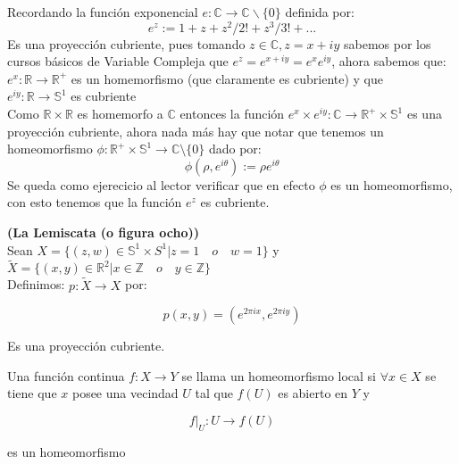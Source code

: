 \begin{example}
Recordando la funci\'on exponencial $e:\mathbb{C} \rightarrow \mathbb{C} \backslash \lbrace 0 \rbrace$ definida por:
$$ e^z:=1+z+z^2/2!+z^3/3!+...$$
Es una proyecci\'on cubriente, pues tomando $z \in \mathbb{C}, z=x+iy$ sabemos por los cursos b\'asicos de Variable Compleja que $e^z=e^{x+iy}=e^x e^{iy}$, ahora sabemos que:\\

$e^x: \mathbb R \rightarrow \mathbb{R^{+}} $ es un homemorfismo (que claramente es cubriente) y que\\

$e^{iy}: \mathbb R \rightarrow \mathbb S^1 $ es cubriente\\
Como $\mathbb R \times \mathbb R$ es homemorfo a $\mathbb{C}$ entonces la funci\'on $e^x \times e^{iy} :\mathbb{C} \rightarrow \mathbb{R^{+}} \times \mathbb S^{1}$ es una proyecci\'on cubriente, ahora nada m\'as hay que notar que tenemos un homeomorfismo $\phi :\mathbb{R^{+}} \times \mathbb S^1 \rightarrow \mathbb{C}\setminus \lbrace 0 \rbrace$ dado por: 
$$\phi(\rho,e^{i \theta}):= \rho e^{i \theta}$$
Se queda como ejerecicio al lector verificar que en efecto $\phi$ es un homeomorfismo, con esto tenemos que la funci\'on $e^z$ es cubriente.\\
\end{example}

\begin{example} \textbf{(La Lemiscata (o figura ocho))}\\
Sean $X=\lbrace (z,w) \in \mathbb S^1\times S^1 \vert z=1 \quad o \quad w=1 \rbrace$ y $\widetilde{X}=\lbrace(x,y)\in \mathbb R^2 \vert x \in \mathbb{Z} \quad o \quad y \in \mathbb{Z} \rbrace$\\

Definimos: $p:\widetilde{X} \rightarrow X$ por:

$$p(x,y)=(e^{2\pi i x},e^{2\pi i y})$$

Es una proyecci\'on cubriente.
\end{example}

\begin{definition}\label{homeo local}
Una funci\'on continua $f:X \rightarrow Y$ se llama un homeomorfismo local si $\forall x \in X$ se tiene que $x$ posee una vecindad $U$ tal que $f(U)$ es abierto en $Y$ y

$$f \vert_{U}:U \rightarrow f(U)$$

es un homeomorfismo
\end{definition}
 
